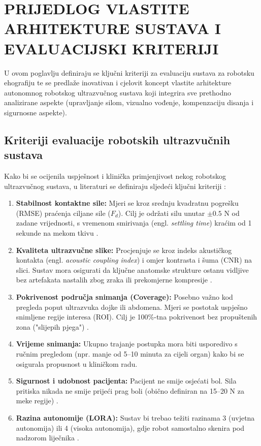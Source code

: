 
\section{PRIJEDLOG VLASTITE ARHITEKTURE SUSTAVA I EVALUACIJSKI KRITERIJI}
\label{sec:vlastita_arhitektura}

U ovom poglavlju definiraju se ključni kriteriji za evaluaciju sustava za robotsku ehografiju te se predlaže inovativan i cjelovit koncept vlastite arhitekture autonomnog robotskog ultrazvučnog sustava koji integrira sve prethodno analizirane aspekte (upravljanje silom, vizualno vođenje, kompenzaciju disanja i sigurnosne aspekte).

\subsection{Kriteriji evaluacije robotskih ultrazvučnih sustava}
Kako bi se ocijenila uspješnost i klinička primjenjivost nekog robotskog ultrazvučnog sustava, u literaturi se definiraju sljedeći ključni kriteriji \cite{jiang2023robotic, qin2026review, vonhaxthausen2021medical}:
\begin{enumerate}
    \item \textbf{Stabilnost kontaktne sile:} Mjeri se kroz srednju kvadratnu pogrešku (RMSE) praćenja ciljane sile ($F_d$). Cilj je održati silu unutar $\pm 0.5$ N od zadane vrijednosti, s vremenom smirivanja (engl. \textit{settling time}) kraćim od 1 sekunde na mekom tkivu \cite{li2026robotic}.
    \item \textbf{Kvaliteta ultrazvučne slike:} Procjenjuje se kroz indeks akustičkog kontakta (engl. \textit{acoustic coupling index}) i omjer kontrasta i šuma (CNR) na slici. Sustav mora osigurati da ključne anatomske strukture ostanu vidljive bez artefakata nastalih zbog zraka ili prekomjerne kompresije \cite{akbari2021robotic}.
    \item \textbf{Pokrivenost područja snimanja (Coverage):} Posebno važno kod pregleda poput ultrazvuka dojke ili abdomena. Mjeri se postotak uspješno snimljene regije interesa (ROI). Cilj je 100\%-tna pokrivenost bez propuštenih zona ("slijepih pjega") \cite{ieee2023full}.
    \item \textbf{Vrijeme snimanja:} Ukupno trajanje postupka mora biti usporedivo s ručnim pregledom (npr. manje od 5--10 minuta za cijeli organ) kako bi se osigurala propusnost u kliničkom radu.
    \item \textbf{Sigurnost i udobnost pacijenta:} Pacijent ne smije osjećati bol. Sila pritiska nikada ne smije prijeći prag boli (obično definiran na 15--20 N za meke regije) \cite{ulrich2021probe}.
    \item \textbf{Razina autonomije (LORA):} Sustav bi trebao težiti razinama 3 (uvjetna autonomija) ili 4 (visoka autonomija), gdje robot samostalno skenira pod nadzorom liječnika \cite{vonhaxthausen2021medical}.
\end{enumerate}

